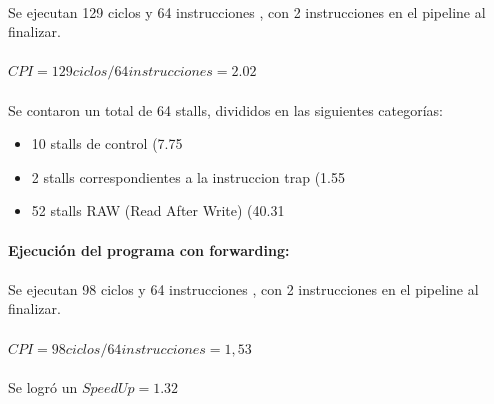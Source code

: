 \documentclass[a4paper,11pt]{article}
\begin{document}
\begin{enumerate}
\paragraph{}
Se ejecutan 129 ciclos y 64 instrucciones , con 2 instrucciones en el  pipeline al finalizar.

\paragraph{}
\begin{center}
$CPI = 129 ciclos / 64 instrucciones = 2.02$
\end{center}

\paragraph{}

Se contaron un total de 64 stalls, divididos en las siguientes categor\'ias:

\begin{itemize}
\item 10 stalls de control (7.75%
\item 2  stalls correspondientes a la instruccion trap (1.55%
\item 52 stalls RAW (Read After Write) (40.31%
\end{itemize}

\paragraph{Ejecuci\'on del programa con forwarding:}


\paragraph{}
Se ejecutan 98 ciclos y 64 instrucciones , con 2 instrucciones en el  pipeline al finalizar.

\paragraph{}
\begin{center}
$CPI = 98 ciclos / 64 instrucciones = 1,53$
\end{center}

\paragraph{}
Se logr\'o un $SpeedUp = 1.32$


\end{enumerate}
\end{document}
